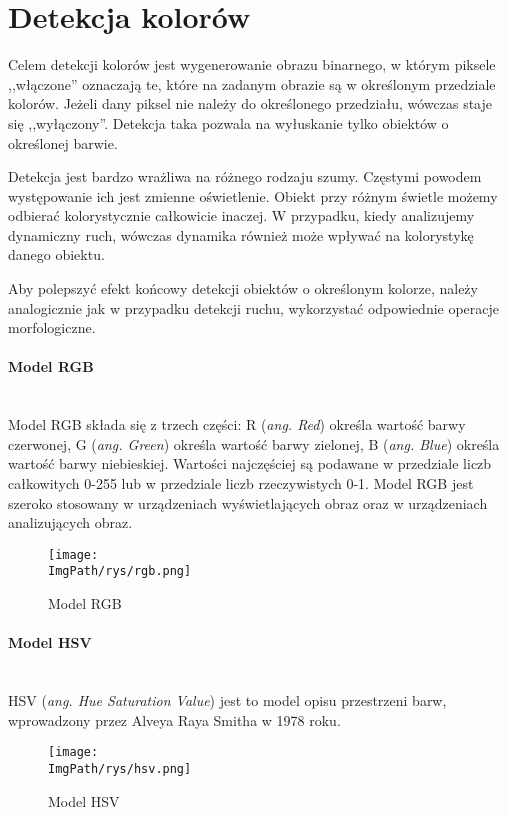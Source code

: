 \documentclass[a4paper,12pt,twoside,openany]{report}
\newcommand{\ImgPath}{.}
\begin{document}
\section{Detekcja kolorów}
Celem detekcji kolorów jest wygenerowanie obrazu binarnego, w którym piksele ,,włączone'' oznaczają te, które na zadanym obrazie są w określonym przedziale kolorów. Jeżeli dany piksel nie należy do określonego  przedziału, wówczas staje się ,,wyłączony''. Detekcja taka pozwala na wyłuskanie tylko obiektów o określonej barwie.

Detekcja jest bardzo wrażliwa na różnego rodzaju szumy. Częstymi powodem występowanie ich jest zmienne oświetlenie. Obiekt przy różnym świetle możemy odbierać kolorystycznie całkowicie inaczej. W przypadku, kiedy analizujemy dynamiczny ruch, wówczas dynamika również może wpływać na kolorystykę danego obiektu.  

Aby polepszyć efekt końcowy detekcji obiektów o określonym kolorze, należy analogicznie jak w przypadku detekcji ruchu, wykorzystać odpowiednie operacje morfologiczne. 

\paragraph{Model RGB} \mbox{} \\
\indent
Model RGB składa się z trzech części: R (\textit{ang. Red}) określa wartość barwy czerwonej, G (\textit{ang. Green}) określa wartość barwy zielonej, B (\textit{ang. Blue}) określa wartość barwy niebieskiej. Wartości najczęściej są podawane w przedziale liczb całkowitych 0-255 lub w przedziale liczb rzeczywistych 0-1. Model RGB jest szeroko stosowany w urządzeniach wyświetlających obraz oraz w urządzeniach analizujących obraz.
\begin{figure}[H]	
	\centering
	\texttt{[image: \\ImgPath/rys/rgb.png]}
	
	\caption{Model RGB}
\end{figure}

\paragraph{Model HSV} \mbox{} \\ \indent
HSV (\textit{ang. Hue Saturation Value}) jest to model opisu przestrzeni barw, wprowadzony przez Alveya Raya Smitha w 1978 roku.

\begin{figure}[H]	
	\centering
	\texttt{[image: \\ImgPath/rys/hsv.png]}
	
	\caption{Model HSV}
\end{figure}
\end{document}
